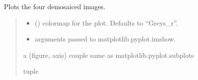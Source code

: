 \documentclass[letterpaper,10pt,english]{sphinxmanual}
\begin{document}
\begin{fulllineitems}
\begin{fulllineitems}
\label{\detokenize{micropolarray:micropolarray.micropol_image.MicropolImage.show_demo_images}}
\pysigstartsignatures
{}
\pysigstopsignatures
\sphinxAtStartPar
Plots the four demosaiced images.
\begin{quote}\begin{description}
\begin{itemize}
\item {} 
\sphinxAtStartPar
{} (\sphinxstyleliteralemphasis{\sphinxupquote{, }}) \textendash{} colormap for the plot. Defaults to “Greys\_r”.

\item {} 
\sphinxAtStartPar
{} \textendash{} arguments passed to matplotlib.pyplot.imshow.

\end{itemize}

\sphinxAtStartPar
a (figure, axis) couple same as matplotlib.pyplot.subplots

\sphinxAtStartPar
tuple

\end{description}\end{quote}

\end{fulllineitems}



\end{fulllineitems}
\end{document}
